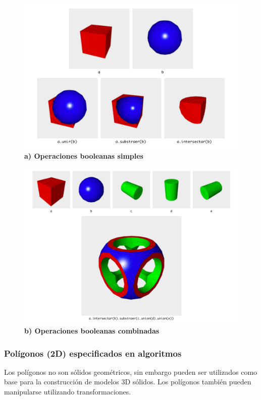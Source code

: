 \begin{figure}[h]
\includegraphics[width=14cm]{Img/Modelos/modelado15.jpg}
\centering
\caption{\textbf{ \footnotesize{a) Operaciones booleanas simples }}}
\label{aCSG}
\end{figure}

\begin{figure}[h]
\includegraphics[width=16cm]{Img/Modelos/modelado16.jpg}
\centering
\caption{\textbf{ \footnotesize{b) Operaciones booleanas combinadas }}}
\label{bCSG}
\end{figure}

\clearpage

\subsubsection{Polígonos (2D) especificados en algoritmos}
Los polígonos no son sólidos geométricos, sin embargo pueden ser utilizados como base para la construcción de modelos 3D sólidos. Los polígonos también pueden manipularse utilizando transformaciones.

